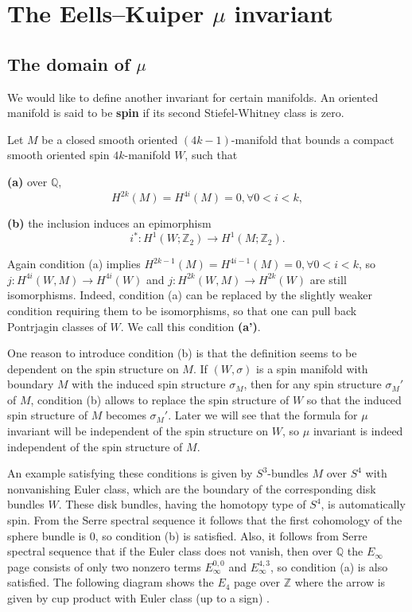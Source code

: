 \documentclass[twoside]{article}
\begin{document}
\section{The Eells--Kuiper \texorpdfstring{$\mu$}{mu} invariant}


\subsection{The domain of \texorpdfstring{$\mu$}{mu}}
We would like to define another invariant for certain manifolds. An oriented manifold is said to be \textbf{spin} if its second Stiefel-Whitney class is zero. 

Let $M$ be a closed smooth oriented $(4k-1)$-manifold that bounds a compact smooth oriented spin $4k$-manifold $W$, such that 

\textbf{(a)} over $\mathbb{Q}$, 
\[
H^{2k}(M) = H^{4i}(M) = 0, \forall 0 < i < k, 
\]

\textbf{(b)} the inclusion induces an epimorphism
\[
i^* \colon H^1(W;\mathbb{Z}_2) \to  H^1(M;\mathbb{Z}_2). 
\]


Again condition (a) implies $H^{2k-1}(M) = H^{4i-1}(M) = 0, \forall 0 < i < k$, so $j \colon H^{4i}(W,M) \to  H^{4i}(W)$ and $j \colon H^{2k}(W,M) \to  H^{2k}(W)$ are still isomorphisms. Indeed, condition (a) can be replaced by the slightly weaker condition requiring them to be isomorphisms, so that one can pull back Pontrjagin classes of $W$. We call this condition \textbf{(a')}. 

One reason to introduce condition (b) is that the definition seems to be dependent on the spin structure on $M$. If $(W, \sigma)$ is a spin manifold with boundary $M$ with the induced spin structure $\sigma_M$, then for any spin structure $\sigma_M'$ of $M$, condition (b) allows to replace the spin structure of $W$ so that the induced spin structure of $M$ becomes $\sigma_M'$. Later we will see that the formula for $\mu$ invariant will be independent of the spin structure on $W$, so $\mu$ invariant is indeed independent of the spin structure of $M$. 

An example satisfying these conditions is given by $S^3$-bundles $M$ over $S^4$ with nonvanishing Euler class, which are the boundary of the corresponding disk bundles $W$. These disk bundles, having the homotopy type of $S^4$, is automatically spin. From the Serre spectral sequence it follows that the first cohomology of the sphere bundle is $0$, so condition (b) is satisfied. Also, it follows from Serre spectral sequence that if the Euler class does not vanish, then over $\mathbb{Q}$ the $E_\infty$ page consists of only two nonzero terms $E_\infty^{0,0}$ and $E_\infty^{4,3}$, so condition (a) is also satisfied. The following diagram shows the $E_4$ page over $\mathbb{Z}$ where the arrow is given by cup product with Euler class (up to a sign) . 
\end{document}
